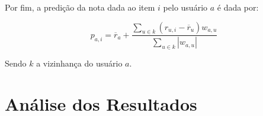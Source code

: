 \documentclass[12pt,a4paper,header]{abnt}
\begin{document}
Por fim, a predição da nota dada ao item $i$ pelo usuário $a$ é dada por:

\begin{equation}
p_{a, i} = \overline{r}_a + \frac{\sum_{u \in k}{(r_{u, i} - \overline{r}_u) w_{a, u}}}{\sum_{u \in k}{\left|w_{a, u}\right|}}
\end{equation}

Sendo $k$ a vizinhança do usuário $a$.



% 
% 
% 
% 
% 
% 
% 
% 


\chapter{Análise dos Resultados}
\end{document}
